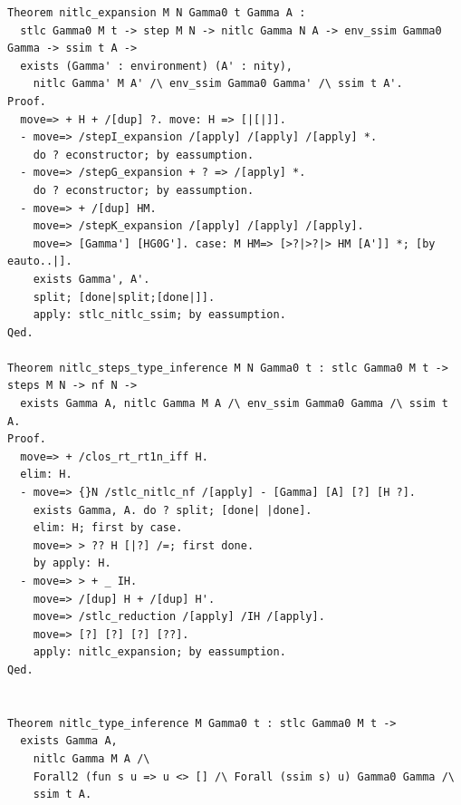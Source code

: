 \documentclass[10pt,a4paper]{article}
\begin{document}
\begin{lstlisting}[style=authorcoq]
Theorem nitlc_expansion M N Gamma0 t Gamma A :
  stlc Gamma0 M t -> step M N -> nitlc Gamma N A -> env_ssim Gamma0 Gamma -> ssim t A ->
  exists (Gamma' : environment) (A' : nity),
    nitlc Gamma' M A' /\ env_ssim Gamma0 Gamma' /\ ssim t A'.
Proof.
  move=> + H + /[dup] ?. move: H => [|[|]].
  - move=> /stepI_expansion /[apply] /[apply] /[apply] *.
    do ? econstructor; by eassumption.
  - move=> /stepG_expansion + ? => /[apply] *.
    do ? econstructor; by eassumption.
  - move=> + /[dup] HM.
    move=> /stepK_expansion /[apply] /[apply] /[apply].
    move=> [Gamma'] [HG0G']. case: M HM=> [>?|>?|> HM [A']] *; [by eauto..|].
    exists Gamma', A'.
    split; [done|split;[done|]].
    apply: stlc_nitlc_ssim; by eassumption.
Qed.

Theorem nitlc_steps_type_inference M N Gamma0 t : stlc Gamma0 M t -> steps M N -> nf N ->
  exists Gamma A, nitlc Gamma M A /\ env_ssim Gamma0 Gamma /\ ssim t A.
Proof.
  move=> + /clos_rt_rt1n_iff H.
  elim: H.
  - move=> {}N /stlc_nitlc_nf /[apply] - [Gamma] [A] [?] [H ?].
    exists Gamma, A. do ? split; [done| |done].
    elim: H; first by case.
    move=> > ?? H [|?] /=; first done.
    by apply: H.
  - move=> > + _ IH.
    move=> /[dup] H + /[dup] H'.
    move=> /stlc_reduction /[apply] /IH /[apply].
    move=> [?] [?] [?] [??].
    apply: nitlc_expansion; by eassumption.
Qed.


Theorem nitlc_type_inference M Gamma0 t : stlc Gamma0 M t ->
  exists Gamma A,
    nitlc Gamma M A /\
    Forall2 (fun s u => u <> [] /\ Forall (ssim s) u) Gamma0 Gamma /\
    ssim t A.


\end{lstlisting}
\end{document}
